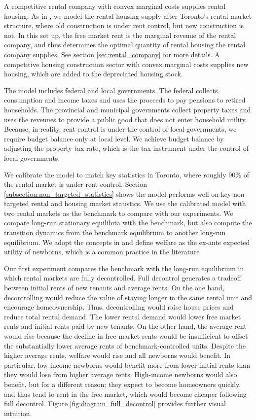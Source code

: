 \documentclass[parskip=full]{article}
\begin{document}
A competitive rental company with convex marginal costs supplies rental housing. As in \citet{fallis-1985}, we model the rental housing supply after Toronto's rental market structure, where old construction is under rent control, but new construction is not. In this set up, the free market rent is the marginal revenue of the rental company, and thus determines the optimal quantity of rental housing the rental company supplies. See section \ref{sec:rental_company} for more details. A competitive housing construction sector with convex marginal costs supplies new housing, which are added to the depreciated housing stock. 

The model includes federal and local governments. The federal collects consumption and income taxes and uses the proceeds to pay pensions to retired households. The provincial and municipal governments collect property taxes and uses the revenues to provide a public good that does not enter household utility. Because, in reality, rent control is under the control of local governments, we require budget balance only at local level. We achieve budget balance by adjusting the property tax rate, which is the tax instrument under the control of local governments.

We calibrate the model to match key statistics in Toronto, where roughly 90\% of the rental market is under rent control. Section \ref{subsection:non_targeted_statistics} shows the model performs well on key non-targeted rental and housing market statistics. We use the calibrated model with two rental markets as the benchmark to compare with our experiments. We compare long-run stationary equilibria with the benchmark, but also compute the transition dynamics from the benchmark equilibrium to another long-run equilibrium.  We adopt the concepts in \citet{ralws-1971} and define welfare as the ex-ante expected utility of newborns, which is a common practice in the literature \citep{conesa-et-al,gkkoc}

Our first experiment compares the benchmark with the long-run equilibrium in which rental markets are fully decontrolled. Full decontrol generates a tradeoff between initial rents of new tenants and average rents. On the one hand, decontrolling would reduce the value of staying longer in the same rental unit and encourage homeownership. Thus, decontrolling would raise house prices and reduce total rental demand. The lower rental demand would lower free market rents and initial rents paid by new tenants. On the other hand, the average rent would rise because the decline in free market rents would be insufficient to offset the substantially lower average rents of benchmark-controlled units. Despite the higher average rents, welfare would rise and all newborns would benefit. In particular, low-income newborns would benefit more from lower initial rents than they would lose from higher average rents. High-income newborns would also benefit, but for a different reason; they expect to become homeowners quickly, and thus tend to rent in the free market, which would become cheaper following full decontrol. Figure \ref{fig:diagram_full_decontrol} provides further visual intuition.
\end{document}
